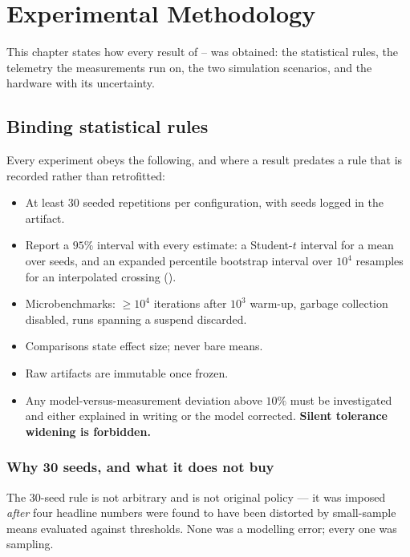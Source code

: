 \chapter{Experimental Methodology}\label{ch:methodology}

This chapter states how every result of -- was obtained: the
statistical rules, the telemetry the measurements run on, the two simulation scenarios, and the
hardware with its uncertainty.

\section{Binding statistical rules}\label{sec:rules}

Every experiment obeys the following, and where a result predates a rule that is recorded rather
than retrofitted:

\begin{itemize}
\item At least $30$ seeded repetitions per configuration, with seeds logged in the artifact.
\item Report a $95\%$ interval with every estimate: a Student-$t$ interval for a mean over seeds,
      and an expanded percentile bootstrap interval over $10^4$ resamples for an interpolated
      crossing ().
\item Microbenchmarks: $\geq 10^4$ iterations after $10^3$ warm-up, garbage collection disabled,
      runs spanning a suspend discarded.
\item Comparisons state effect size; never bare means.
\item Raw artifacts are immutable once frozen.
\item Any model-versus-measurement deviation above $10\%$ must be investigated and either explained
      in writing or the model corrected. \textbf{Silent tolerance widening is forbidden.}
\end{itemize}

\subsection{Why 30 seeds, and what it does not buy}

The 30-seed rule is not arbitrary and is not original policy --- it was imposed \emph{after} four
headline numbers were found to have been distorted by small-sample means evaluated against
thresholds. None was a modelling error; every one was sampling.

